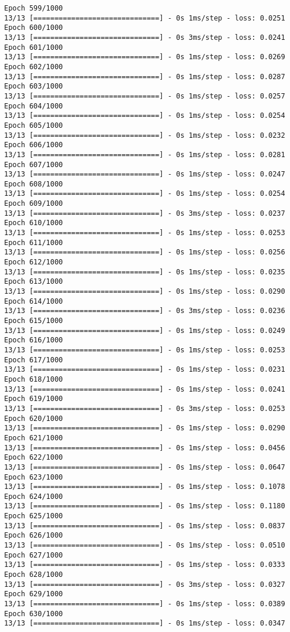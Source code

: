 \documentclass[11pt]{article}
\begin{document}
\begin{Verbatim}[commandchars=\\\{\}]
Epoch 599/1000
13/13 [==============================] - 0s 1ms/step - loss: 0.0251
Epoch 600/1000
13/13 [==============================] - 0s 3ms/step - loss: 0.0241
Epoch 601/1000
13/13 [==============================] - 0s 1ms/step - loss: 0.0269
Epoch 602/1000
13/13 [==============================] - 0s 1ms/step - loss: 0.0287
Epoch 603/1000
13/13 [==============================] - 0s 1ms/step - loss: 0.0257
Epoch 604/1000
13/13 [==============================] - 0s 1ms/step - loss: 0.0254
Epoch 605/1000
13/13 [==============================] - 0s 1ms/step - loss: 0.0232
Epoch 606/1000
13/13 [==============================] - 0s 1ms/step - loss: 0.0281
Epoch 607/1000
13/13 [==============================] - 0s 1ms/step - loss: 0.0247
Epoch 608/1000
13/13 [==============================] - 0s 1ms/step - loss: 0.0254
Epoch 609/1000
13/13 [==============================] - 0s 3ms/step - loss: 0.0237
Epoch 610/1000
13/13 [==============================] - 0s 1ms/step - loss: 0.0253
Epoch 611/1000
13/13 [==============================] - 0s 1ms/step - loss: 0.0256
Epoch 612/1000
13/13 [==============================] - 0s 1ms/step - loss: 0.0235
Epoch 613/1000
13/13 [==============================] - 0s 1ms/step - loss: 0.0290
Epoch 614/1000
13/13 [==============================] - 0s 3ms/step - loss: 0.0236
Epoch 615/1000
13/13 [==============================] - 0s 1ms/step - loss: 0.0249
Epoch 616/1000
13/13 [==============================] - 0s 1ms/step - loss: 0.0253
Epoch 617/1000
13/13 [==============================] - 0s 1ms/step - loss: 0.0231
Epoch 618/1000
13/13 [==============================] - 0s 1ms/step - loss: 0.0241
Epoch 619/1000
13/13 [==============================] - 0s 3ms/step - loss: 0.0253
Epoch 620/1000
13/13 [==============================] - 0s 1ms/step - loss: 0.0290
Epoch 621/1000
13/13 [==============================] - 0s 1ms/step - loss: 0.0456
Epoch 622/1000
13/13 [==============================] - 0s 1ms/step - loss: 0.0647
Epoch 623/1000
13/13 [==============================] - 0s 1ms/step - loss: 0.1078
Epoch 624/1000
13/13 [==============================] - 0s 1ms/step - loss: 0.1180
Epoch 625/1000
13/13 [==============================] - 0s 1ms/step - loss: 0.0837
Epoch 626/1000
13/13 [==============================] - 0s 1ms/step - loss: 0.0510
Epoch 627/1000
13/13 [==============================] - 0s 1ms/step - loss: 0.0333
Epoch 628/1000
13/13 [==============================] - 0s 3ms/step - loss: 0.0327
Epoch 629/1000
13/13 [==============================] - 0s 1ms/step - loss: 0.0389
Epoch 630/1000
13/13 [==============================] - 0s 1ms/step - loss: 0.0347

\end{Verbatim}
\end{document}
